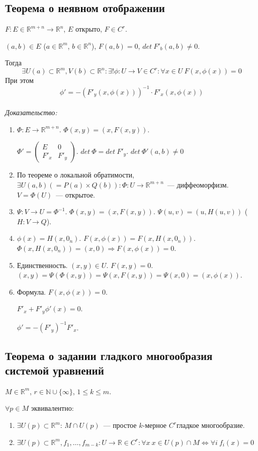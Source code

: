 \documentclass[paper=a4, fontsize=11pt]{article}
\begin{document}
\subsection{Теорема о неявном отображении}
$F: E \in \mathds{R}^{m+n} \rightarrow \mathds{R}^n$, $E$ открыто, $F \in C^r$.

$(a,b) \in E$ ($a \in \mathds{R}^m$, $b \in \mathds{R}^n$), $F(a,b)=0$, $det\ F'_b(a,b) \neq 0$.

Тогда
$$\exists U(a) \subset \mathds{R}^m, V(b) \subset \mathds{R}^n: \exists! \phi: U \rightarrow V \in C^r: \forall x \in U\ F(x,\phi(x))=0$$
При этом
$$\phi' = -(F'_y(x,\phi(x)))^{-1} \cdot F'_x(x,\phi(x))$$
\\
\emph{Доказательство:}
\begin{enumerate}
    \item $\Phi: E \rightarrow \mathds{R}^{m+n}$. $\Phi(x,y) = (x,F(x,y))$.
    
    $\Phi' =
    \begin{pmatrix}
        E & 0\\
        F'_x & F'_y
    \end{pmatrix}$. $det\ \Phi = det\ F'_y$. $det\ \Phi'(a,b) \neq 0$
    \item По теореме о локальной обратимости,
    $\exists U(a,b) (= P(a) \times Q(b)): \Phi: U \rightarrow \mathds{R}^{m+n}$~--- диффеоморфизм. $V = \Phi(U)$~--- открытое.
    \item $\Psi: V \rightarrow U = \Phi^{-1}$. $\Phi(x,y) = (x,F(x,y))$. $\Psi(u,v) = (u,H(u,v))$ ($H: V \rightarrow Q$).
    \item $\phi(x) = H(x, 0_n)$. $F(x, \phi(x)) = F(x, H(x, 0_n))$. $\Phi(x,H(x,0_n))=(x,0) \Rightarrow F(x,\phi(x)) = 0$.
    \item Единственность. $(x,y) \in U$. $F(x,y)=0$. $(x,y) = \Psi(\Phi(x,y)) = \Psi(x,F(x,y)) = \Psi(x,0) = (x,\phi(x))$.
    \item Формула. $F(x,\phi(x)) = 0$.

    $F'_x + F'_y\phi'(x) = 0$.
    
    $\phi' = -(F'_y)^{-1}F'_x$.
\end{enumerate}

\subsection{Теорема о задании гладкого многообразия системой уравнений}
$M \in \mathds{R}^m$, $r \in \mathds{N} \cup \{\infty\}$, $1 \leq k \leq m$.

$\forall p \in M$ эквивалентно:
\begin{enumerate}
    \item $\exists U(p) \subset \mathds{R}^m$: $M \cap U(p)$~--- простое $k$-мерное $C^r$гладкое многообразие.
    \item $\exists U(p) \subset \mathds{R}^m, f_1,\dots,f_{m-k}: U \rightarrow \mathds{R} \in C^r:
    \forall x\ x \in U(p) \cap M \Leftrightarrow \forall i\ f_i(x)=0$
\end{enumerate}
\end{document}

